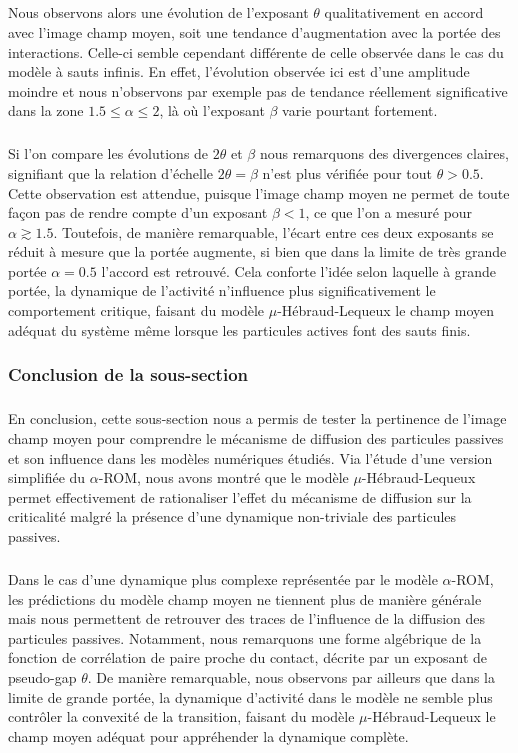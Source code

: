 \subparagraph{}Nous observons alors une évolution de l'exposant $\theta$ qualitativement en accord avec l'image champ moyen, soit une tendance d'augmentation avec la portée des interactions. Celle-ci semble cependant différente de celle observée dans le cas du modèle à sauts infinis. En effet, l'évolution observée ici est d'une amplitude moindre et nous n'observons par exemple pas de tendance réellement significative dans la zone $1.5 \leq \alpha \leq 2$, là où l'exposant $\beta$ varie pourtant fortement.

\subparagraph{}Si l'on compare les évolutions de $2\theta$ et $\beta$ nous remarquons des divergences claires, signifiant que la relation d'échelle $2\theta = \beta$ n'est plus vérifiée pour tout $\theta > 0.5$. Cette observation est attendue, puisque l'image champ moyen ne permet de toute façon pas de rendre compte d'un exposant $\beta < 1$, ce que l'on a mesuré pour $\alpha \gtrsim 1.5$. Toutefois, de manière remarquable, l'écart entre ces deux exposants se réduit à mesure que la portée augmente, si bien que dans la limite de très grande portée $\alpha = 0.5$ l'accord est retrouvé. Cela conforte l'idée selon laquelle à grande portée, la dynamique de l'activité n'influence plus significativement le comportement critique, faisant du modèle $\mu$-Hébraud-Lequeux le champ moyen adéquat du système même lorsque les particules actives font des sauts finis.

\subsubsection{Conclusion de la sous-section}

\subparagraph{}En conclusion, cette sous-section nous a permis de tester la pertinence de l'image champ moyen pour comprendre le mécanisme de diffusion des particules passives et son influence dans les modèles numériques étudiés. Via l'étude d'une version simplifiée du $\alpha$-ROM, nous avons montré que le modèle $\mu$-Hébraud-Lequeux permet effectivement de rationaliser l'effet du mécanisme de diffusion sur la criticalité malgré la présence d'une dynamique non-triviale des particules passives. 

\subparagraph{}Dans le cas d'une dynamique plus complexe représentée par le modèle $\alpha$-ROM, les prédictions du modèle champ moyen ne tiennent plus de manière générale mais nous permettent de retrouver des traces de l'influence de la diffusion des particules passives. Notamment, nous remarquons une forme algébrique de la fonction de corrélation de paire proche du contact, décrite par un exposant de pseudo-gap $\theta$. De manière remarquable, nous observons par ailleurs que dans la limite de grande portée, la dynamique d'activité dans le modèle ne semble plus contrôler la convexité de la transition, faisant du modèle $\mu$-Hébraud-Lequeux le champ moyen adéquat pour appréhender la dynamique complète.


